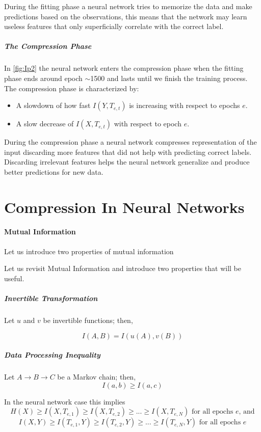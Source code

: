 During the fitting phase a neural network tries to memorize the data and make
predictions based on the observations, this means that the network may learn
useless features that only superficially correlate with the correct label.

\subparagraph{The Compression Phase} In \autoref{fig:Ip2} the neural network
enters the compression phase when the fitting phase ends around epoch $\sim$1500
and lasts until we finish the training process. The compression phase is
characterized by:
\begin{itemize}
  \item{
      A slowdown of how fast $I(Y, T_{e,t})$ is increasing with respect to epochs
      $e$. 
    }
  \item{
      A slow decrease of $I(X, T_{e,t})$ with respect to epoch $e$.
    }
\end{itemize}

During the compression phase a neural network compresses representation of the
input discarding more features that did not help with predicting correct labels.
Discarding irrelevant features helps the neural network generalize and produce
better predictions for new data. 

\section{Compression In Neural Networks}

\paragraph{Mutual Information} 
Let us introduce two properties of mutual information 

Let us revisit Mutual Information and introduce two properties that will be
useful.

\subparagraph{Invertible Transformation} 
Let $u$ and $v$ be invertible functions; then,

\begin{equation}
  I(A, B) = I(u(A), v(B))
\end{equation}

\subparagraph{Data Processing Inequality} 
Let $ A \rightarrow B \rightarrow C$ be a Markov chain; then,
\begin{equation}
  I(a,b) \geq I(a,c)
\end{equation}

In the neural network case this implies 
\begin{equation}
  H(X) \geq I(X,T_{e,1}) \geq I(X, T_{e,2}) \geq ... \geq I(X,T_{e,N}) 
  \text{ for all epochs } e \text{, and}
  \label{eq:dpiIneq1}
\end{equation}
\begin{equation}
  I(X, Y) \geq I(T_{e,1}, Y) \geq I(T_{e,2}, Y) \geq ... \geq I(T_{e,N}, Y) 
  \text{ for all epochs } e 
  \label{eq:dpiIneq2}
\end{equation}


